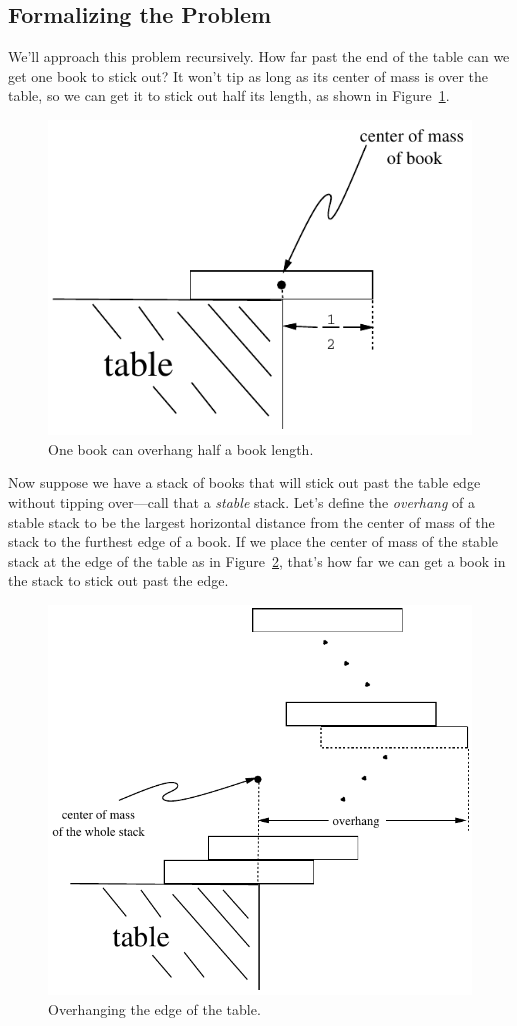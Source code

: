 \subsection{Formalizing the Problem}

We'll approach this problem recursively.  How far past the end of the
table can we get one book to stick out?  It won't tip as long as its
center of mass is over the table, so we can get it to stick out half its
length, as shown in Figure~\ref{one-stable-book}.

\begin{figure}[htbp]
\centerline{\includegraphics[width=.40\textwidth]{figures/bookstack-3}}
\caption{One book can overhang half a book length.}
\label{one-stable-book}
\end{figure}

Now suppose we have a stack of books that will stick out past the table
edge without tipping over---call that a \emph{stable} stack.  Let's define
the \emph{overhang} of a stable stack to be the largest horizontal
distance from the center of mass of the stack to the furthest edge of a
book.  If we place the center of mass of the stable stack at the edge of
the table as in Figure~\ref{overhang}, that's how far we can get a book in
the stack to stick out past the edge.

\begin{figure}
\centerline{\includegraphics[width=.4\textwidth]{figures/bookstack-2}}
\caption{Overhanging the edge of the table.}
\label{overhang}
\end{figure}


